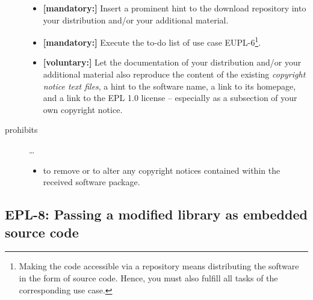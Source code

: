 \begin{description}
\begin{itemize}
  \item \textbf{[mandatory:]} Insert a prominent hint to the download repository
  into your distribution and/or your additional material.
  
  \item \textbf{[mandatory:]} Execute the to-do list of use case EUPL-6\footnote{
  Making the code accessible via a repository means distributing the software in
  the form of source code. Hence, you must also fulfill all tasks of the
  corresponding use case.}.
  
 
  \item \textbf{[voluntary:]} Let the documentation of your distribution and/or
  your additional material  also reproduce the content of the existing
  \emph{copyright notice text files}, a hint to the software name, a link to its
  homepage, and a link to the EPL 1.0 license -- especially as a subsection of
  your own copyright notice.
  
\end{itemize}

\item[prohibits] \ldots
\begin{itemize}
  \item to remove or to alter any copyright notices contained within the
  received software package.
\end{itemize}

\end{description}

\subsection{EPL-8: Passing a modified library as embedded source code}
\label{OSUC-10-EPL}

